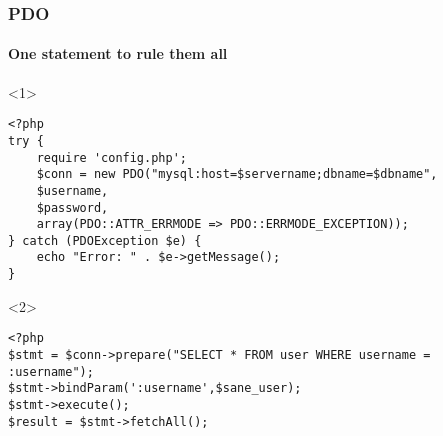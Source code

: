 \documentclass[aspectratio=169,10pt,t]{beamer}
\begin{document}
\begin{frame}[fragile]
	\frametitle{PDO}
	\framesubtitle{One statement to rule them all}
	\begin{onlyenv}

		\begin{verbatim}
<?php
try {
	require 'config.php';
	$conn = new PDO("mysql:host=$servername;dbname=$dbname",
	$username,
	$password,
	array(PDO::ATTR_ERRMODE => PDO::ERRMODE_EXCEPTION));
} catch (PDOException $e) {
	echo "Error: " . $e->getMessage();
}
		\end{verbatim}
	\end{onlyenv}
	\begin{onlyenv}
		\begin{verbatim}
<?php
$stmt = $conn->prepare("SELECT * FROM user WHERE username = :username");
$stmt->bindParam(':username',$sane_user);
$stmt->execute();
$result = $stmt->fetchAll();
		\end{verbatim}
	\end{onlyenv}
\end{frame}
\end{document}
